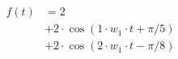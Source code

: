 \correct
\begin{center}
\begin{align*}
f(t) &= 2 \\
&+ 2 \cdot \cos( 1 \cdot w_1 \cdot t + \pi/5) \\
&+ 2 \cdot \cos( 2 \cdot w_1 \cdot t - \pi/8)
\end{align*}
\end{center}
